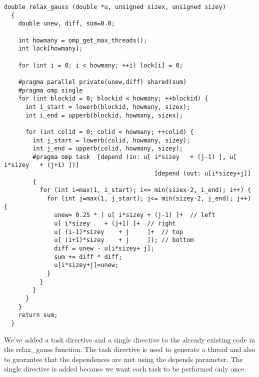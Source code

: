 \documentclass{report}
\begin{document}
\begin{lstlisting}[style=C2]
  double relax_gauss (double *u, unsigned sizex, unsigned sizey)
  {
    double unew, diff, sum=0.0;

    int howmany = omp_get_max_threads();
    int lock[howmany];

    for (int i = 0; i < howmany; ++i) lock[i] = 0;

    #pragma parallel private(unew,diff) shared(sum)
    #pragma omp single
    for (int blockid = 0; blockid < howmany; ++blockid) {
      int i_start = lowerb(blockid, howmany, sizex);
      int i_end = upperb(blockid, howmany, sizex);

      for (int colid = 0; colid < howmany; ++colid) {
        int j_start = lowerb(colid, howmany, sizey);
        int j_end = upperb(colid, howmany, sizey);
        #pragma omp task  [depend (in: u[ i*sizey	+ (j-1) ], u[ i*sizey	+ (j+1) ])]
                                          [depend (out: u[i*sizey+j]]
        {
          for (int i=max(1, i_start); i<= min(sizex-2, i_end); i++) {
            for (int j=max(1, j_start); j<= min(sizey-2, j_end); j++) {
              unew= 0.25 * ( u[ i*sizey	+ (j-1) ]+  // left
              u[ i*sizey	+ (j+1) ]+  // right
              u[ (i-1)*sizey	+ j     ]+  // top
              u[ (i+1)*sizey	+ j     ]); // bottom
              diff = unew - u[i*sizey+ j];
              sum += diff * diff;
              u[i*sizey+j]=unew;
            }
          }
        }
      }
    }
    return sum;
  }
\end{lstlisting}

We've added a task directive and a single directive to the already existing code in the relax\_gauss function. The task directive is used to generate a thread and also to guarantee that the dependences are met using the depends parameter. The single directive is added because we want each task to be performed only once.
\end{document}
